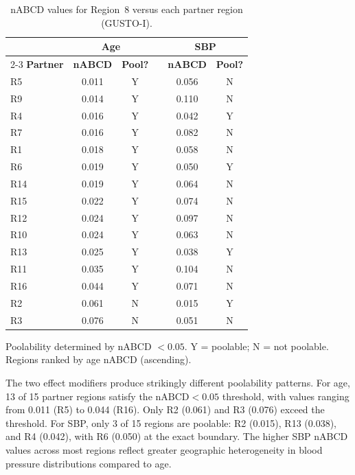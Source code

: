 \begin{table}[ht]
\caption{nABCD values for Region~8 versus each partner region (GUSTO-I).\label{tab:gusto_nabcd}}
\begin{tabular*}{\textwidth}{@{\extracolsep\fill}lcclcc@{}}
\toprule
 & \multicolumn{2}{c}{\textbf{Age}} & & \multicolumn{2}{c}{\textbf{SBP}} \\
\cmidrule{2-3} \cmidrule{5-6}
\textbf{Partner} & \textbf{nABCD} & \textbf{Pool?} & & \textbf{nABCD} & \textbf{Pool?} \\
\midrule
R5  & 0.011 & Y & & 0.056 & N \\
R9  & 0.014 & Y & & 0.110 & N \\
R4  & 0.016 & Y & & 0.042 & Y \\
R7  & 0.016 & Y & & 0.082 & N \\
R1  & 0.018 & Y & & 0.058 & N \\
R6  & 0.019 & Y & & 0.050 & Y \\
R14 & 0.019 & Y & & 0.064 & N \\
R15 & 0.022 & Y & & 0.074 & N \\
R12 & 0.024 & Y & & 0.097 & N \\
R10 & 0.024 & Y & & 0.063 & N \\
R13 & 0.025 & Y & & 0.038 & Y \\
R11 & 0.035 & Y & & 0.104 & N \\
R16 & 0.044 & Y & & 0.071 & N \\
R2  & 0.061 & N & & 0.015 & Y \\
R3  & 0.076 & N & & 0.051 & N \\
\bottomrule
\end{tabular*}
\begin{tablenotes}
\item Poolability determined by nABCD $< 0.05$. Y = poolable; N = not poolable. Regions ranked by age nABCD (ascending).
\end{tablenotes}
\end{table}

The two effect modifiers produce strikingly different poolability patterns. For age, 13 of 15 partner regions satisfy the $\text{nABCD} < 0.05$ threshold, with values ranging from 0.011 (R5) to 0.044 (R16). Only R2 (0.061) and R3 (0.076) exceed the threshold. For SBP, only 3 of 15 regions are poolable: R2 (0.015), R13 (0.038), and R4 (0.042), with R6 (0.050) at the exact boundary. The higher SBP nABCD values across most regions reflect greater geographic heterogeneity in blood pressure distributions compared to age.

